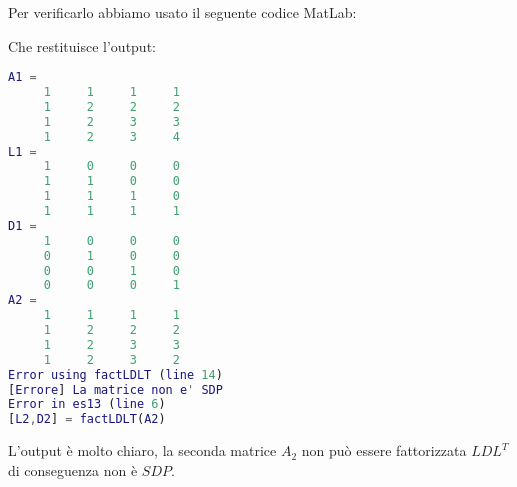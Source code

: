 \begin{flushleft}
Per verificarlo abbiamo usato il seguente codice MatLab:

Che restituisce l'output:
\begin{lstlisting}[language=matlab, basicstyle = \small]
A1 =
     1     1     1     1
     1     2     2     2
     1     2     3     3
     1     2     3     4
L1 =
     1     0     0     0
     1     1     0     0
     1     1     1     0
     1     1     1     1
D1 =
     1     0     0     0
     0     1     0     0
     0     0     1     0
     0     0     0     1
A2 =
     1     1     1     1
     1     2     2     2
     1     2     3     3
     1     2     3     2
Error using factLDLT (line 14)
[Errore] La matrice non e' SDP
Error in es13 (line 6)
[L2,D2] = factLDLT(A2) 
\end{lstlisting}
L'output è molto chiaro, la seconda matrice $A_{2}$ non può essere fattorizzata $LDL^T$ di conseguenza non è $SDP$.
\end{flushleft}

